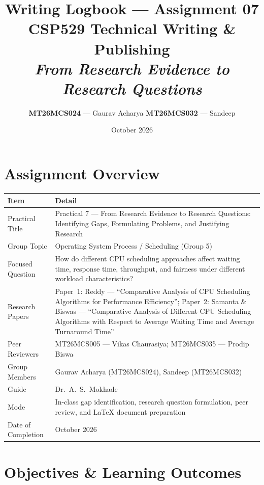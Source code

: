 \documentclass[11pt, a4paper]{article}
\title{
    \vspace{-1cm}
    \textbf{Writing Logbook --- Assignment 07} \\[0.3em]
    \large CSP529 Technical Writing \& Publishing \\[0.2em]
    \large \textit{From Research Evidence to Research Questions}
}
\author{
    \textbf{MT26MCS024} --- Gaurav Acharya \quad
    \textbf{MT26MCS032} --- Sandeep
}
\date{October 2026}
\begin{document}
\maketitle
\thispagestyle{fancy}

\section{Assignment Overview}

\begin{tabular}{@{}p{4.5cm} p{10cm}@{}}
    \toprule
    \textbf{Item} & \textbf{Detail} \\
    \midrule
    Practical Title & Practical 7 --- From Research Evidence to Research Questions: Identifying Gaps, Formulating Problems, and Justifying Research \\
    Group Topic & Operating System Process / Scheduling (Group 5) \\
    Focused Question & How do different CPU scheduling approaches affect waiting time, response time, throughput, and fairness under different workload characteristics? \\
    Research Papers & Paper~1: Reddy --- ``Comparative Analysis of CPU Scheduling Algorithms for Performance Efficiency''; Paper~2: Samanta \& Biswas --- ``Comparative Analysis of Different CPU Scheduling Algorithms with Respect to Average Waiting Time and Average Turnaround Time'' \\
    Peer Reviewers & MT26MCS005 --- Vikas Chaurasiya; MT26MCS035 --- Prodip Biswa \\
    Group Members & Gaurav Acharya (MT26MCS024), Sandeep (MT26MCS032) \\
    Guide & Dr.\ A.\ S.\ Mokhade \\
    Mode & In-class gap identification, research question formulation, peer review, and LaTeX document preparation \\
    Date of Completion & October 2026 \\
    \bottomrule
\end{tabular}

\section{Objectives \& Learning Outcomes}
\end{document}
